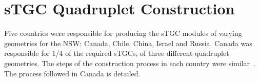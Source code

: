 


\section{sTGC Quadruplet Construction}
\label{sec:stgc_construction}

Five countries were responsible for producing the sTGC modules of varying geometries for the NSW: Canada, Chile, China, Israel and Russia. Canada was responsible for 1/4 of the required sTGCs, of three different quadruplet geometries. The steps of the construction process in each country were similar~\cite{nsw_tdr}. The process followed in Canada is detailed.

